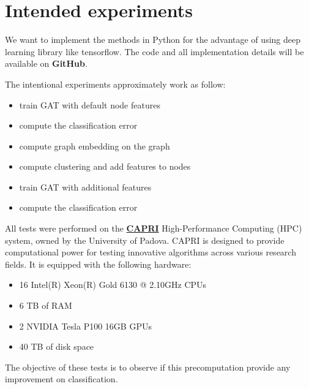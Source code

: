 \documentclass[12pt,conference]{ieeeconf} %
\begin{document}

\section{Intended experiments}
We want to implement the methods in Python for the advantage of using deep learning library like tensorflow.
The code and all implementation details will be available on \textbf{GitHub}. \par

The intentional experiments approximately work as follow:
\begin{itemize}
    \item train GAT with default node features
    \item compute the classification error
    \item compute graph embedding on the graph
    \item compute clustering and add features to nodes
    \item train GAT with additional features
    \item compute the classification error
\end{itemize}

All tests were performed on the \textbf{\href{https://capri.dei.unipd.it}{CAPRI}} High-Performance Computing (HPC) system, owned by the University of Padova. CAPRI is designed to provide computational power for testing innovative algorithms across various research fields. It is equipped with the following hardware:
\begin{itemize}
    \item 16 Intel(R) Xeon(R) Gold 6130 @ 2.10GHz CPUs
    \item 6 TB of RAM
    \item 2 NVIDIA Tesla P100 16GB GPUs
    \item 40 TB of disk space
\end{itemize}

The objective of these tests is to observe if this precomputation provide any improvement on classification.\par


\printbibliography[nottype=online]
\end{document}
